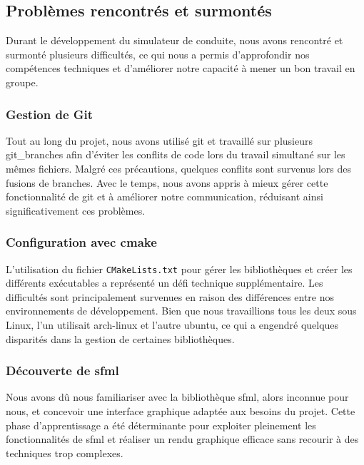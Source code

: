 \subsection{Problèmes rencontrés et surmontés}\label{subsec:problemes-rencontres-et-surmontes} %
Durant le développement du simulateur de conduite, nous avons rencontré et surmonté plusieurs difficultés, ce qui nous a permis d'approfondir nos compétences techniques et d'améliorer notre capacité à mener un bon travail en groupe.

\subsubsection{Gestion de Git}\label{subsubsec:git}
Tout au long du projet, nous avons utilisé \gls{git} et travaillé sur plusieurs \gls{git_branches} afin d'éviter les conflits de code lors du travail simultané sur les mêmes fichiers.
Malgré ces précautions, quelques conflits sont survenus lors des fusions de branches.
Avec le temps, nous avons appris à mieux gérer cette fonctionnalité de \gls{git} et à améliorer notre communication, réduisant ainsi significativement ces problèmes.

\subsubsection{Configuration avec \gls{cmake}}\label{subsubsec:cmake}
L'utilisation du fichier \texttt{CMakeLists.txt} pour gérer les bibliothèques et créer les différents exécutables a représenté un défi technique supplémentaire.
Les difficultés sont principalement survenues en raison des différences entre nos environnements de développement.
Bien que nous travaillions tous les deux sous Linux, l'un utilisait \gls{arch-linux} et l'autre \gls{ubuntu}, ce qui a engendré quelques disparités dans la gestion de certaines bibliothèques.

\subsubsection{Découverte de \gls{sfml}}\label{subsubsec:sfml}
Nous avons dû nous familiariser avec la bibliothèque \gls{sfml}, alors inconnue pour nous, et concevoir une interface graphique adaptée aux besoins du projet.
Cette phase d'apprentissage a été déterminante pour exploiter pleinement les fonctionnalités de \gls{sfml} et réaliser un rendu graphique efficace sans recourir à des techniques trop complexes.

